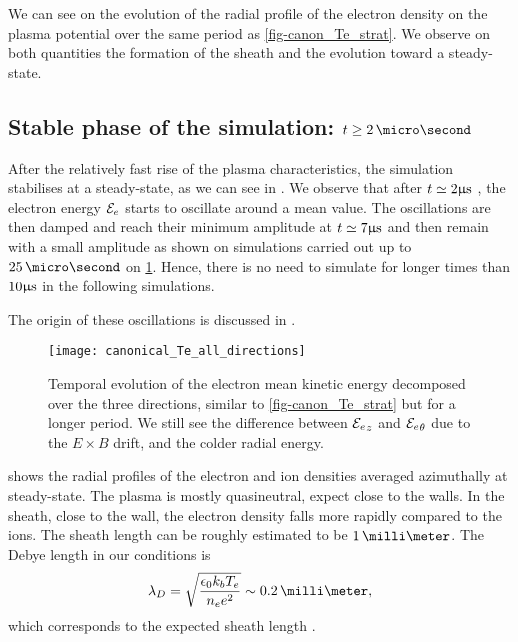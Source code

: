   We can see on  the evolution of the radial profile of the electron density on the plasma potential over the same period as \cref{fig-canon_Te_strat}.
  We observe on both quantities the formation of the sheath and the evolution toward a steady-state.
  
  \subsection{Stable phase of the simulation\string: $t \geq 2\,\micro\second$}
  \label{subsec-stablephase}
  After the relatively fast rise of the plasma characteristics, the simulation stabilises at a steady-state, as we can see in .
  We observe that after $t\simeq2\mathrm{\upmu s}$ , the electron energy ${\mathcal{E}_e}$ starts to oscillate around a mean value.
  The oscillations are then damped and reach their minimum amplitude at  $t\simeq 7\mathrm{\upmu s}$ and then remain with a small amplitude as shown on simulations carried out up to $25\,\micro\second$ on \cref{fig-canon_Te_all}.
  Hence, there is no need to simulate for longer times than $10\mathrm{\upmu s}$ in the following simulations.
  
  The origin of these oscillations is discussed in .
  
  
  \begin{figure}[hbtp]
    \centering
    \texttt{[image: canonical\_Te\_all\_directions]}
    \caption{Temporal evolution of the electron mean kinetic energy decomposed over the three directions, similar to \cref{fig-canon_Te_strat} but for a longer period. We still see the difference between ${\mathcal{E}_e}_z$ and ${\mathcal{E}_e}_{\theta}$ due to the $E\times B$ drift, and the colder radial energy.}
    \label{fig-canon_Te_all}
  \end{figure}
  

   shows the radial profiles of the electron and ion densities averaged azimuthally at steady-state.
  The plasma is mostly quasineutral, expect close to the walls.
  In the sheath, close to the wall, the electron density falls more rapidly compared to the ions.
  The sheath length can be roughly estimated to be $1\,\milli\meter$.
  The Debye length in our conditions is
  \begin{equation} \label{eq-debye}
    \lambda_D = \sqrt{\frac{\epsilon_0 k_b T_e}{n_e e^2}} \sim 0.2\,\milli\meter,
  \end{equation}
  which corresponds to the expected sheath length \citep{chabert2014}.
  
